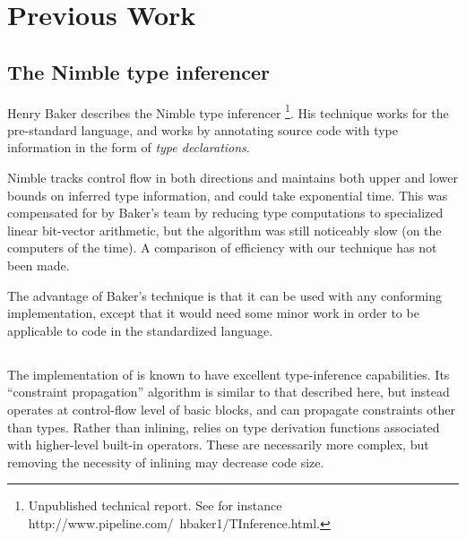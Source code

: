 \section{Previous Work}

\subsection{The Nimble type inferencer}

Henry Baker describes the Nimble type inferencer
\footnote{Unpublished technical report.  See for instance
  http://www.pipeline.com/~hbaker1/TInference.html.}.  His technique
works for the pre-standard \commonlisp{} language, and works by
annotating source code with type information in the form of
\emph{type declarations}.

Nimble tracks control flow in both directions and maintains both
upper and lower bounds on inferred type information, and could take exponential time. This was compensated for by Baker's team by
reducing type computations to specialized linear bit-vector
arithmetic, but the algorithm was still noticeably slow (on the
computers of the time). A comparison of efficiency with our technique
has not been made.

The advantage of Baker's technique is that it can be used with any
conforming \commonlisp{} implementation, except that it would need some
minor work in order to be applicable to code in the standardized
language.

\subsection{\sbcl{}}

The \sbcl{} implementation of \commonlisp{} is known to have excellent
type-inference capabilities. Its ``constraint propagation'' algorithm
is similar to that described here, but instead operates at control-flow
level of basic blocks, and can propagate constraints other than types.
Rather than inlining, \sbcl{} relies on type derivation functions
associated with higher-level built-in operators. These are necessarily
more complex, but removing the necessity of inlining may decrease
code size.
